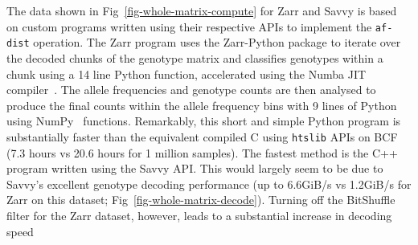 \documentclass[a4paper,num-refs]{oup-contemporary}
\begin{document}
The data shown in Fig~\ref{fig-whole-matrix-compute} for Zarr and Savvy
is based on custom programs written using their respective APIs
to implement the \texttt{af-dist} operation. The Zarr program uses
the Zarr-Python package to iterate over the decoded chunks of the
genotype matrix and classifies genotypes within a chunk using a 14 line Python
function, accelerated using the Numba JIT compiler~\cite{lam2015numba}.
The allele frequencies and genotype counts are then analysed to produce
the final counts within the allele frequency bins with 9 lines of
Python using NumPy~\cite{harris2020array} functions. Remarkably, this
short and simple Python program is substantially faster than the
equivalent compiled C using \texttt{htslib} APIs on BCF (7.3 hours
vs 20.6 hours for 1 million samples).
The fastest method is the
C++ program written using the Savvy API. This would largely seem
to be due to Savvy's excellent genotype decoding performance
(up to 6.6GiB/s vs 1.2GiB/s for Zarr on this dataset;
Fig~\ref{fig-whole-matrix-decode}).
Turning off the BitShuffle filter for the Zarr dataset,
however, leads to a substantial increase in decoding speed
\end{document}
